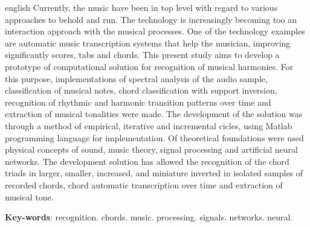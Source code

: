 \begin{resumo}[Abstract]
 \begin{otherlanguage*}{english}
   Currently, the music have been in top level with regard to various approaches to behold and run. The technology is increasingly becoming too an interaction approach with the musical processes. One of the technology examples are automatic music transcription systems that help the musician, improving significantly scores, tabs and chords. This present study aims to develop a prototype of computational solution for recognition of musical harmonies. For this purpose, implementations of spectral analysis of the audio sample, classification of musical notes, chord classification with support inversion, recognition of rhythmic and harmonic transition patterns over time and extraction of musical tonalities were made. The development of the solution was through a method of empirical, iterative and incremental cicles, using Matlab programming language for implementation. Of theoretical foundations were used physical concepts of sound, music theory, signal processing and artificial neural networks. The development solution has allowed the recognition of the chord triads in larger, smaller, increased, and miniature inverted in isolated samples of recorded chords, chord automatic transcription over time and extraction of musical tone.

   \vspace{\onelineskip}

   \noindent
   \textbf{Key-words}: recognition. chords. music. processing. signals. networks. neural.
 \end{otherlanguage*}
\end{resumo}
